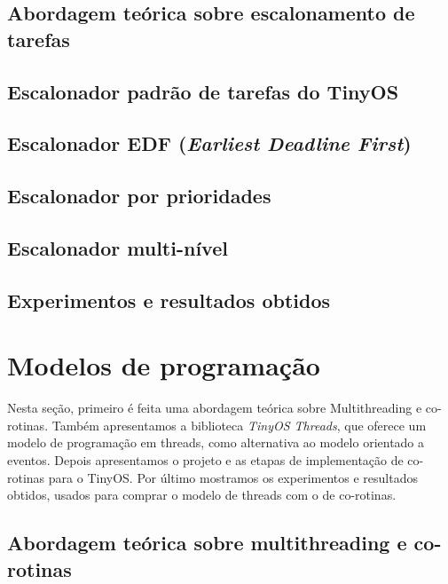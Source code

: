 \documentclass[a4paper, 10pt]{article}
\begin{document}
\subsection{Abordagem teórica sobre escalonamento de tarefas}\label{escalonador-teoria}


\subsection{Escalonador padrão de tarefas do TinyOS}\label{escalonadorpadrao}


\subsection{Escalonador EDF (\textit{Earliest Deadline First})}\label{escalonadoredf}


\subsection{Escalonador por prioridades}\label{escalonadorprioridade}


\subsection{Escalonador multi-nível}


\subsection{Experimentos e resultados obtidos}

\section{Modelos de programação}\label{modelo-programacao}
Nesta seção, primeiro é feita uma abordagem teórica sobre Multithreading e co-rotinas. 
Também apresentamos a biblioteca \textit{TinyOS Threads}, que oferece um modelo de programação em threads, como
alternativa ao modelo orientado a eventos.
Depois apresentamos o projeto e as etapas de implementação de co-rotinas para o TinyOS.
Por último mostramos os experimentos e resultados obtidos, usados para comprar o modelo de threads com o de co-rotinas.

\subsection{Abordagem teórica sobre multithreading e co-rotinas}
\label{multithread-corotinas}
\end{document}
